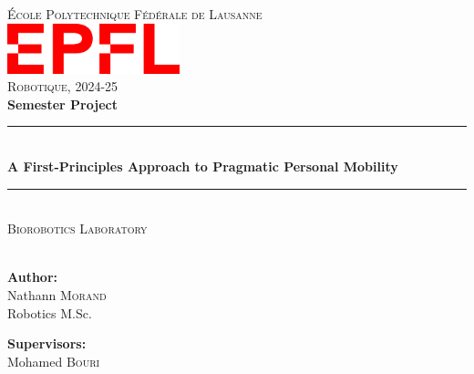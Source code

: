\documentclass[a4paper, 11 pt]{article}
\begin{document}
\thispagestyle{empty}
\begin{center}
    \newcommand{\HRule}{\rule{\linewidth}{0.5mm}}
    
    \textsc{\LARGE École Polytechnique Fédérale de Lausanne}\\[0.5cm]
    \includegraphics[width=5cm]{Figures/epfl_red.png}\\[0.5cm]
    \LARGE{\textsc{Robotique, 2024-25}}\\[0.5cm]
    \huge{\textbf{Semester Project}}
    
    \HRule \\[0.4cm]
    {\huge \bfseries A First-Principles Approach to Pragmatic Personal Mobility}\\[0.1cm]
    \HRule \\[0.5cm]
    \LARGE{\textsc{Biorobotics Laboratory} \\
    }\\[0.5cm]
    
    \vspace{5mm}
    \vspace{15mm}
    
    \begin{minipage}{2in} \Large
    \textbf{Author:}\\
    Nathann \textsc{Morand}\\
    Robotics M.Sc.
    \end{minipage}
    \hfill
    \begin{minipage}{2.1in} \Large
    \textbf{Supervisors:}\\
    Mohamed \textsc{Bouri} \\
    \end{minipage}
\end{center}
\end{document}
